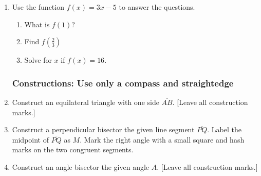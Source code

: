 \documentclass[12pt, twoside]{article}
\begin{document}
\begin{enumerate}[itemsep=0.5cm]
\item Use the function $f(x) = 3x-5$ to answer the questions.
  \begin{multicols}{2}
  \begin{enumerate}[itemsep=2cm]
      \item What is $f(1)$?
      \item Find $f(\frac{2}{3})$
      \item Solve for $x$ if $f(x) = 16$.
  \end{enumerate}
  \end{multicols} \vspace{1cm}

\newpage
\subsubsection*{Constructions: Use only a compass and straightedge}

\item Construct an equilateral triangle with one side $\overline{AB}$.  [Leave all construction marks.]
\vspace{5cm}
\begin{center}
\end{center} \vspace{2cm}

\item Construct a perpendicular bisector the given line segment $\overline{PQ}$. Label the midpoint of $\overline{PQ}$ as $M$. Mark the right angle with a small square and hash marks on the two congruent segments.
    \vspace{3cm}
    \begin{center}
    \end{center}
    \vspace{2cm}

\newpage
  \item Construct an angle bisector the given angle $A$.  [Leave all construction marks.]
      \vspace{4cm}
      \begin{center}
      \end{center}


\end{enumerate}
\end{document}
